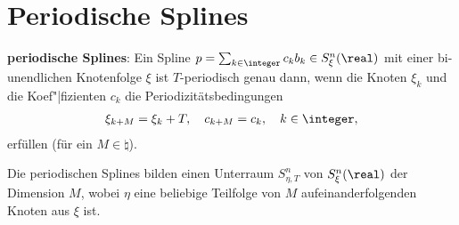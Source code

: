 \section{%
    Periodische Splines%
}

\textbf{periodische Splines}:
Ein Spline $p = \sum_{k \in \integer} c_k b_k \in S_\xi^n(\real)$
mit einer bi-unendlichen Knotenfolge $\xi$ ist $T$-periodisch genau dann,
wenn die Knoten $\xi_k$ und die Koef"|fizienten $c_k$ die Periodizitätsbedingungen
\begin{align*}
    \xi_{k+M} = \xi_k + T,\quad
    c_{k+M} = c_k,\quad
    k \in \integer,
\end{align*}
erfüllen (für ein $M \in \natural$).

Die periodischen Splines bilden einen Unterraum $S_{\eta,T}^n$ von $S_\xi^n(\real)$
der Dimension $M$, wobei $\eta$ eine beliebige Teilfolge von $M$ aufeinanderfolgenden Knoten aus
$\xi$ ist.

\pagebreak
